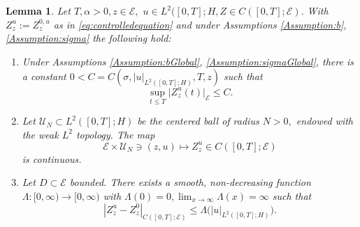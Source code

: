 \documentclass[10pt, reqno]{amsart}
\newcommand{\e}{\mathcal{E}}
\newtheorem{lem}{Lemma}
\theoremstyle{definition}
\numberwithin{lem}{section}
\numberwithin{cor}{section}
\numberwithin{prop}{section}
\numberwithin{thm}{section}
\numberwithin{dfn}{section}
\begin{document}
\begin{lem}\label{lem:ZaprioricompactnesslemGlobal}
	Let $T,\alpha>0, z\in\mathcal{E},$ $u\in L^2([0,T]; H, Z\in C([0,T];\e).$ With $Z_z^u:=Z_z^{0,u}$ as in \eqref{eq:controlledequation} and under Assumptions \ref{Assumption:b}, \ref{Assumption:sigma} the following hold:
 \begin{enumerate}
     \item Under Assumptions \ref{Assumption:bGlobal}, \ref{Assumption:sigmaGlobal}, there is a constant $0<C=C(\sigma, |u|_{L^2([0,T];H)}, T, z)$ such that 
	\begin{equation}\label{ZaprioriGlobal}
	\sup_{t\leq T}\big|Z^{u}_{z}(t)\big|_{\mathcal{E}}\leq C.
 \end{equation}
 \item  Let $\mathcal{U}_N\subset L^2([0,T];H)$ be the centered ball of radius $N>0,$ endowed with the weak $L^2$ topology. The map 
	$$\e\times \mathcal{U}_N \ni (z, u)\longmapsto Z^u_z\in C([0,T];\e)$$
is continuous.
\item Let $D\subset\e$ bounded. There exists a smooth, non-decreasing function $\Lambda:[0,\infty)\rightarrow [0,\infty)$ with $\Lambda(0)=0, \lim_{x\to\infty}\Lambda(x)=\infty$ such that $$| Z_z^{u}-Z_z^0|_{C([0,T];\e)}\leq \Lambda\big(|u|_{L^2([0,T];H)}\big). $$
 \end{enumerate}
\end{lem}
\end{document}

